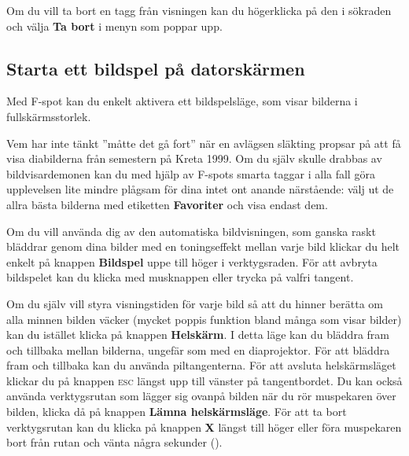 \documentclass[a4paper,final]{memoir} %
\begin{document}
Om du vill ta bort en tagg från visningen kan du högerklicka på den i sökraden och välja \textbf{Ta bort} i menyn som poppar upp. 



\subsection{Starta ett bildspel på datorskärmen}


Med F-spot kan du enkelt aktivera ett bildspelsläge, som visar bilderna i fullskärmsstorlek.

Vem har inte tänkt ''måtte det gå fort'' när en avlägsen släkting propsar på att få visa diabilderna från semestern på Kreta 1999. Om du själv skulle drabbas av bildvisardemonen kan du med hjälp av F-spots smarta taggar i alla fall göra upplevelsen lite mindre plågsam för dina intet ont anande närstående: välj ut de allra bästa bilderna med etiketten \textbf{Favoriter} och visa endast dem. 

Om du vill använda dig av den automatiska bildvisningen, som ganska raskt bläddrar genom dina bilder med en toningseffekt mellan varje bild klickar du helt enkelt på knappen \textbf{Bildspel} uppe till höger i verktygsraden. För att avbryta bildspelet kan du klicka med musknappen eller trycka på valfri tangent.

Om du själv vill styra visningstiden för varje bild så att du hinner berätta om alla minnen bilden väcker (mycket poppis funktion bland många som visar bilder) kan du istället klicka på knappen \textbf{Helskärm}. I detta läge kan du bläddra fram och tillbaka mellan bilderna, ungefär som med en diaprojektor. För att bläddra fram och tillbaka kan du använda piltangenterna. För att avsluta helskärmsläget klickar du på knappen \textsc{esc} längst upp till vänster på tangentbordet. Du kan också använda verktygsrutan som lägger sig ovanpå bilden när du rör muspekaren över bilden, klicka då på knappen \textbf{Lämna helskärmsläge}. För att ta bort verktygsrutan kan du klicka på knappen \textbf{X} längst till höger eller föra muspekaren bort från rutan och vänta några sekunder (). 

\end{document}
